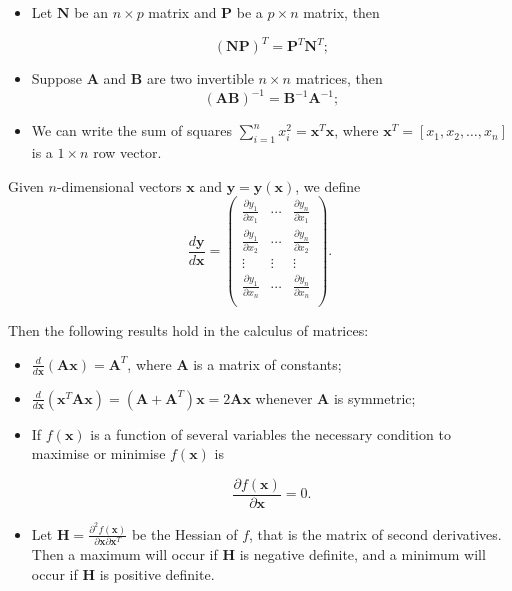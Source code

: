 \documentclass[
]{book}
\providecommand{\tightlist}{%
  \setlength{\itemsep}{0pt}\setlength{\parskip}{0pt}}
\begin{document}
\begin{itemize}
\tightlist
\item
  Let \(\mathbf{N}\) be an \(n \times p\) matrix and \(\mathbf{P}\) be a \(p \times n\) matrix, then

  \[(\mathbf{N}\mathbf{P})^T = \mathbf{P}^T \mathbf{N}^T;\]
\item
  Suppose \(\mathbf{A}\) and \(\mathbf{B}\) are two invertible \(n \times n\) matrices, then\\

  \[(\mathbf{A}\mathbf{B})^{-1} = \mathbf{B}^{-1} \mathbf{A}^{-1};\]
\item
  We can write the sum of squares \(\sum\limits_{i=1}^n x_i^2 = \mathbf{x}^T \mathbf{x}\), where \(\mathbf{x}^T=[x_1, x_2,\dots,x_n]\) is a \(1 \times n\) row vector.
\end{itemize}

Given \(n\)-dimensional vectors \(\mathbf{x}\) and \(\mathbf{y} = \mathbf{y}(\mathbf{x})\), we define\\

\[
\frac{d \mathbf{y}}{d \mathbf{x}} = \left(
\begin{array}{ccc}
\frac{\partial y_1}{\partial x_1} & \cdots & \frac{\partial y_n}{\partial x_1}\\
\frac{\partial y_1}{\partial x_2 }& \cdots & \frac{\partial y_n}{\partial x_2}\\
\vdots & \vdots & \vdots\\
\frac{\partial y_1}{\partial x_n }& \cdots & \frac{\partial y_n}{\partial x_n}\\
\end{array}
\right) .
\]

Then the following results hold in the calculus of matrices:

\begin{itemize}
\tightlist
\item
  \(\frac{d}{d\mathbf{x}}(\mathbf{A}\mathbf{x}) = \mathbf{A}^T\), where \(\mathbf{A}\) is a matrix of constants;\\
\item
  \(\frac{d}{d\mathbf{x}}(\mathbf{x}^T \mathbf{A} \mathbf{x}) = (\mathbf{A}+\mathbf{A}^T)\mathbf{x} = 2\mathbf{A}\mathbf{x}\) whenever \(\mathbf{A}\) is symmetric;\\
\item
  If \(f(\mathbf{x})\) is a function of several variables the necessary condition to maximise or minimise \(f(\mathbf{x})\) is

  \[\frac{\partial f(\mathbf{x}) }{ \partial \mathbf{x} } = 0.\]
\item
  Let \(\mathbf{H}=\frac{\partial^2 f(\mathbf{x}) }{ \partial \mathbf{x} \partial \mathbf{x}^T}\) be the Hessian of \(f\), that is the matrix of second derivatives. Then a maximum will occur if \(\mathbf{H}\) is negative definite, and a minimum will occur if \(\mathbf{H}\) is positive definite.
\end{itemize}
\end{document}
